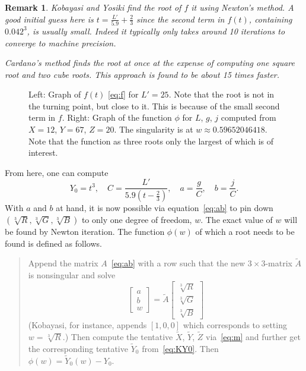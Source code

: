 \documentclass{scrartcl}
\newtheorem*{remark}{Remark}
\theoremstyle{named}
\begin{document}
\begin{remark}
  Kobayasi and Yosiki find the root of $f$ it using Newton's method.  A good initial
  guess here is $t = \frac{L'}{5.9} + \frac{2}{3}$ since the second term in $f(t)$,
  containing $0.042^3$, is usually small. Indeed it typically only takes around 10
  iterations to converge to machine precision.

  Cardano's method finds the root at once at the expense of computing one square root
  and two cube roots. This approach is found to be about 15 times faster.
\end{remark}


\begin{figure}
  \centering
  \hfill
  
  \hfill
  
  \hfill
  \caption{Left: Graph of $f(t)$ \eqref{eq:f} for $L'=25$. Note that the root is not in
  the turning point, but close to it. This is because of the small second term in $f$.
  Right: Graph of the function $\phi$ for $L$, $g$, $j$ computed from $X=12$, $Y=67$,
  $Z=20$. The singularity is at $w\approx 0.59652046418$.  Note that the function as
  three roots only the largest of which is of interest.}\label{fig:singularity}
\end{figure}

From here, one can compute
\begin{equation}\label{eq:gather}
  Y_0 = t^3,\quad
  C = \frac{L'}{5.9 \left(t - \frac{2}{3}\right)},\quad
  a = \frac{g}{C},\quad
  b = \frac{j}{C}.
\end{equation}
With $a$ and $b$ at hand, it is now possible via equation~\eqref{eq:ab} to pin down
$(\sqrt[3]{R}, \sqrt[3]{G}, \sqrt[3]{B})$ to only one degree of freedom, $w$.
The exact value of $w$ will be found by Newton iteration. The function $\phi(w)$
of which a root needs to be found is defined as follows.
\begin{quotation}
  Append the matrix $A$~\eqref{eq:ab} with a row such that the new $3\times3$-matrix
  $\tilde{A}$ is nonsingular and solve
  \[
    \begin{bmatrix}
      a\\
      b\\
      w
    \end{bmatrix}
    =
    \tilde{A}
    \begin{bmatrix}
      \sqrt[3]{R}\\
      \sqrt[3]{G}\\
      \sqrt[3]{B}
    \end{bmatrix}
  \]
  (Kobayasi, for instance, appends $[1, 0, 0]$ which corresponds to setting
  $w=\sqrt[3]{R}$.) Then compute the tentative $\tilde{X}$, $\tilde{Y}$, $\tilde{Z}$
  via~\eqref{eq:m} and further get the corresponding tentative $\tilde{Y}_0$
  from~\eqref{eq:KY0}. Then $\phi(w) = \tilde{Y}_0(w) - Y_0$.
\end{quotation}
\end{document}
